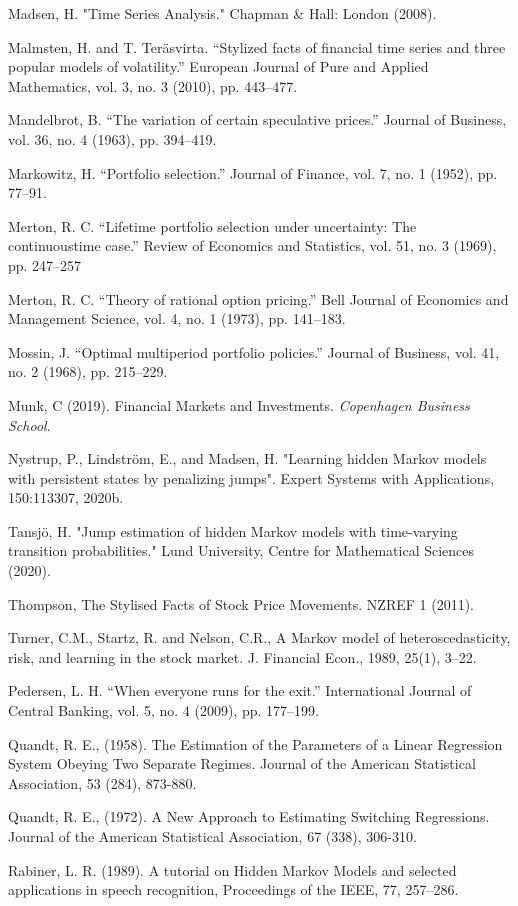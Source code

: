 Madsen, H. "Time Series Analysis." Chapman \& Hall: London (2008).

Malmsten, H. and T. Teräsvirta. “Stylized facts of financial time series and three popular models of volatility.” European Journal of Pure and Applied Mathematics, vol. 3, no. 3 (2010), pp. 443–477.

Mandelbrot, B. “The variation of certain speculative prices.” Journal of Business, vol. 36, no. 4 (1963), pp. 394–419.

Markowitz, H. “Portfolio selection.” Journal of Finance, vol. 7, no. 1 (1952), pp. 77–91.

Merton, R. C. “Lifetime portfolio selection under uncertainty: The continuoustime case.” Review of Economics and Statistics, vol. 51, no. 3 (1969), pp. 247–257

Merton, R. C. “Theory of rational option pricing.” Bell Journal of Economics and Management Science, vol. 4, no. 1 (1973), pp. 141–183.

Mossin, J. “Optimal multiperiod portfolio policies.” Journal of Business, vol. 41,
no. 2 (1968), pp. 215–229.

Munk, C (2019). Financial Markets and Investments. \textit{Copenhagen Business School}.

Nystrup, P., Lindström, E., and Madsen, H. "Learning hidden Markov models with persistent states by penalizing jumps". Expert Systems with Applications, 150:113307, 2020b.

Tansjö, H. "Jump estimation of hidden Markov models with time-varying transition probabilities." Lund University, Centre for Mathematical Sciences (2020).

Thompson, The Stylised Facts of Stock Price Movements. NZREF 1 (2011).

Turner, C.M., Startz, R. and Nelson, C.R., A Markov model of heteroscedasticity, risk, and learning in the stock market. J. Financial Econ., 1989, 25(1), 3–22.

Pedersen, L. H. “When everyone runs for the exit.” International Journal of Central Banking, vol. 5, no. 4 (2009), pp. 177–199.

Quandt, R. E., (1958). The Estimation of the Parameters of a Linear Regression System Obeying Two Separate Regimes. Journal of the American Statistical Association, 53 (284), 873-880.

Quandt, R. E., (1972). A New Approach to Estimating Switching Regressions. Journal of the American
Statistical Association, 67 (338), 306-310.

Rabiner, L. R. (1989). A tutorial on Hidden Markov Models and selected applications in speech recognition, Proceedings of the IEEE, 77, 257–286.


